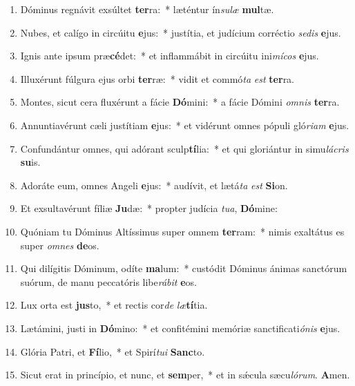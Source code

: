 \documentclass[twoside]{article}
\begin{document}
\begin{paracol}[1]{2}

\begin{enumerate}[wide, itemsep=0mm, labelwidth=!, labelindent=0pt, label=\color{gregoriocolor}\theenumi]
\item Dóminus regnávit exsúltet \textbf{ter}ra:~* læténtur ín\textit{su}\textit{læ} \textbf{mul}tæ.
\item Nubes, et calígo in circúitu \textbf{e}jus:~* justítia, et judícium corréctio \textit{se}\textit{dis} \textbf{e}jus.
\item Ignis ante ipsum præ\textbf{cé}det:~* et inflammábit in circúitu ini\textit{mí}\textit{cos} \textbf{e}jus.
\item Illuxérunt fúlgura ejus orbi \textbf{ter}ræ:~* vidit et commó\textit{ta} \textit{est} \textbf{ter}ra.
\item Montes, sicut cera fluxérunt a fácie \textbf{Dó}mini:~* a fácie Dómini \textit{om}\textit{nis} \textbf{ter}ra.
\item Annuntiavérunt cæli justítiam \textbf{e}jus:~* et vidérunt omnes pópuli gló\textit{ri}\textit{am} \textbf{e}jus.
\item Confundántur omnes, qui adórant sculp\textbf{tí}lia:~* et qui gloriántur in simu\textit{lá}\textit{cris} \textbf{su}is.
\item Adoráte eum, omnes Angeli \textbf{e}jus:~* audívit, et lætá\textit{ta} \textit{est} \textbf{Si}on.
\item Et exsultavérunt fíliæ \textbf{Ju}dæ:~* propter judícia \textit{tu}\textit{a}, \textbf{Dó}mine:
\item Quóniam tu Dóminus Altíssimus super omnem \textbf{ter}ram:~* nimis exaltátus es super \textit{om}\textit{nes} \textbf{de}os.
\item Qui dilígitis Dóminum, odíte \textbf{ma}lum:~* custódit Dóminus ánimas sanctórum suórum, de manu peccatóris libe\textit{rá}\textit{bit} \textbf{e}os.
\item Lux orta est \textbf{jus}to,~* et rectis cor\textit{de} \textit{læ}\textbf{tí}tia.
\item Lætámini, justi in \textbf{Dó}mino:~* et confitémini memóriæ sanctificati\textit{ó}\textit{nis} \textbf{e}jus.
\item Glória Patri, et \textbf{Fí}lio,~* et Spirí\textit{tu}\textit{i} \textbf{Sanc}to.
\item Sicut erat in princípio, et nunc, et \textbf{sem}per,~* et in sǽcula sæcu\textit{ló}\textit{rum}. \textbf{A}men.
\end{enumerate}


\end{paracol}
\end{document}
